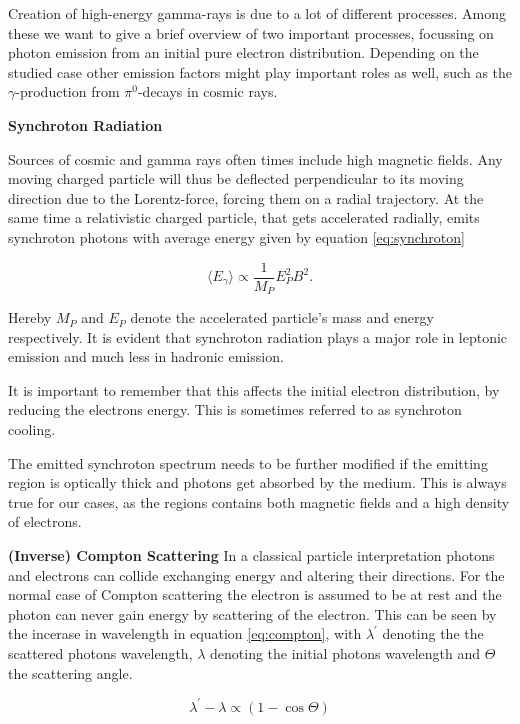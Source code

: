 Creation of high-energy gamma-rays is due to a lot of 
different processes. Among these we want to give a brief 
overview of two important processes, focussing on 
photon emission from an initial pure electron distribution. 
Depending on the studied case other emission factors 
might play important roles as well, such as 
the $\gamma$-production from $\pi^0$-decays in cosmic rays.

\textbf{Synchroton Radiation}

Sources of cosmic and gamma rays often times include 
high magnetic fields. Any moving charged particle will thus be
deflected perpendicular to its moving direction
due to the Lorentz-force, forcing them on a radial trajectory.
At the same time a relativistic charged particle, 
that gets accelerated radially, emits synchroton 
photons with average energy given by 
equation \ref{eq:synchroton}

\begin{equation}
	\langle E_{\gamma} \rangle \propto \frac{1}{M_P} E_P^2 B^2.
	\label{eq:synchroton}
\end{equation}

Hereby $M_P$ and $E_P$ denote the accelerated particle's 
mass and energy respectively. It is evident that 
synchroton radiation plays a major role in leptonic 
emission and much less in hadronic emission.

It is important to remember that this affects the 
initial electron distribution, by reducing the electrons energy.
This is sometimes referred to as synchroton cooling.

The emitted synchroton spectrum needs to be further modified 
if the emitting region is optically thick and photons 
get absorbed by the medium.
This is always true for our cases, as the regions contains 
both magnetic fields and a high density of electrons.

\textbf{(Inverse) Compton Scattering}
In a classical particle interpretation photons and electrons 
can collide exchanging energy and altering their directions.
For the normal case of Compton scattering the electron 
is assumed to be at rest and the photon can never gain 
energy by scattering of the electron.
This can be 
seen by the incerase in wavelength in equation \ref{eq:compton},
with $\lambda^{\prime}$ denoting the the scattered photons 
wavelength, $\lambda$ denoting the initial photons wavelength  
and $\Theta$ the scattering angle.

\begin{equation}
	\lambda^{\prime} - \lambda  \propto \left(1-\cos{\Theta} \right)
	\label{eq:compton}
\end{equation}


